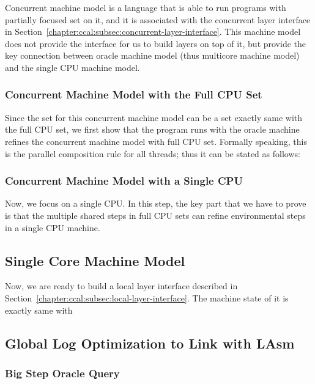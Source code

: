 Concurrent machine model is a language that is able to run programs with partially focused set on it,
and it is associated with the concurrent layer interface in Section~\ref{chapter:ccal:subsec:concurrent-layer-interface}. 
This machine model does not provide the interface for us to build 
layers on top of it, but provide the 
key connection between oracle machine model (thus multicore machine model) and 
the single CPU machine model.  

\subsubsection{Concurrent Machine Model with the Full CPU Set}

Since the set for this concurrent machine model can be a set exactly same with the full CPU set, 
we first show that the program runs with the oracle machine refines the concurrent machine model with full CPU set. 
Formally speaking, 
this is the parallel composition rule for all threads; thus it can be stated as follows:

\subsubsection{Concurrent Machine Model with a Single CPU}

Now, we focus on a single CPU. 
In this step, 
the key part that we have to prove is that the multiple shared steps in full CPU sets can
 refine environmental steps in a single CPU machine. 

\subsection{Single Core Machine Model}
\label{chapter:linking:subsec:single-core-machine-model}

Now, we are ready to build a local layer interface described in Section~\ref{chapter:ccal:subsec:local-layer-interface}. 
The machine state of it is exactly same with 

\subsection{Global Log Optimization to Link with LAsm}
\label{chapter:linking:subsec:global-log-optimization}


\subsubsection{Big Step Oracle Query}


